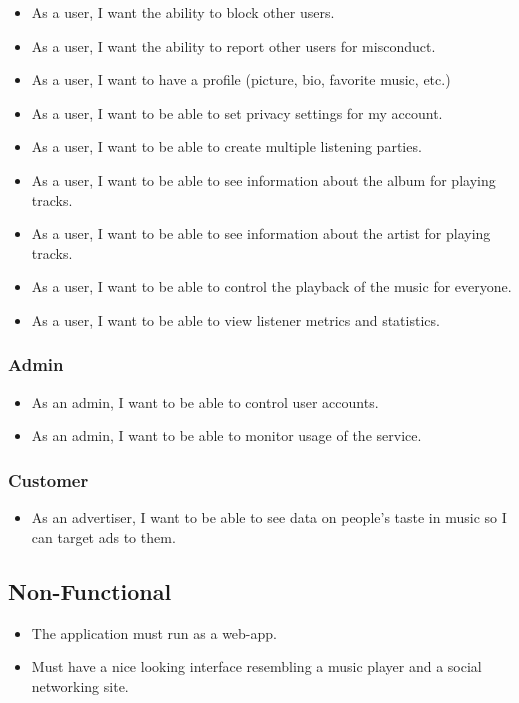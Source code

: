 \documentclass{article}
\begin{document}
\begin{itemize}
    \item As a user, I want the ability to block other users. 
    
    \item As a user, I want the ability to report other users for misconduct.
    
    \item As a user, I want to have a profile (picture, bio, favorite music, etc.)
    
    \item As a user, I want to be able to set privacy settings for my account.
    
    \item As a user, I want to be able to create multiple listening parties.
    
    \item As a user, I want to be able to see information about the album for playing tracks.
    
    \item As a user, I want to be able to see information about the artist for playing tracks.

    \item As a user, I want to be able to control the playback of the music for everyone.
    
    \item As a user, I want to be able to view listener metrics and statistics.

\end{itemize}

\subsubsection{Admin}
\begin{itemize}
    \item As an admin, I want to be able to control user accounts.
    
    \item As an admin, I want to be able to monitor usage of the service.
\end{itemize}

\subsubsection{Customer}
\begin{itemize}
    \item As an advertiser, I want to be able to see data on people's taste in music so I can target ads to them.
\end{itemize}

\subsection{Non-Functional}
\begin{itemize}
    \item The application must run as a web-app.
    
    \item Must have a nice looking interface resembling a music player and a social networking site.
    
\end{itemize}
\end{document}

